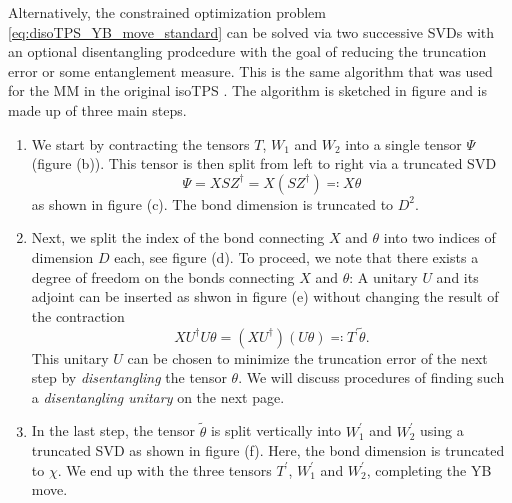 Alternatively, the constrained optimization problem \eqref{eq:disoTPS_YB_move_standard} can be solved via two successive SVDs with an optional disentangling prodcedure with the goal of reducing the truncation error or some entanglement measure. This is the same algorithm that was used for the MM in the original isoTPS \cite{cite:efficient_simulation_of_dynamics_in_two_dimensional_quantum_spin_systems}. The algorithm is sketched in figure \figref{} and is made up of three main steps.
\begin{enumerate}
	\item We start by contracting the tensors $T$, $W_1$ and $W_2$ into a single tensor $\Psi$ (figure \figref{} (b)). This tensor is then split from left to right via a truncated SVD
	\begin{equation}
		\Psi = XSZ^\dagger = X\left(SZ^\dagger\right) \eqqcolon X\theta
	\end{equation}
	as shown in figure \figref{}(c). The bond dimension is truncated to $D^2$.
	\item Next, we split the index of the bond connecting $X$ and $\theta$ into two indices of dimension $D$ each, see figure \figref{}(d). To proceed, we note that there exists a degree of freedom on the bonds connecting $X$ and $\theta$: A unitary $U$ and its adjoint can be inserted as shwon in figure \figref{}(e) without changing the result of the contraction
	\begin{equation}
		XU^\dagger U\theta = \left(XU^\dagger\right)\left(U\theta\right) \eqqcolon T^\prime \tilde{\theta}.
	\end{equation}
	This unitary $U$ can be chosen to minimize the truncation error of the next step by \textit{disentangling} the tensor $\theta$. We will discuss procedures of finding such a \textit{disentangling unitary} on the next page.
	\item In the last step, the tensor $\tilde{\theta}$ is split vertically into $W_1^\prime$ and $W_2^\prime$ using a truncated SVD as shown in figure \figref{}(f). Here, the bond dimension is truncated to $\chi$. We end up with the three tensors $T^\prime$, $W_1^\prime$ and $W_2^\prime$, completing the YB move.
\end{enumerate}
